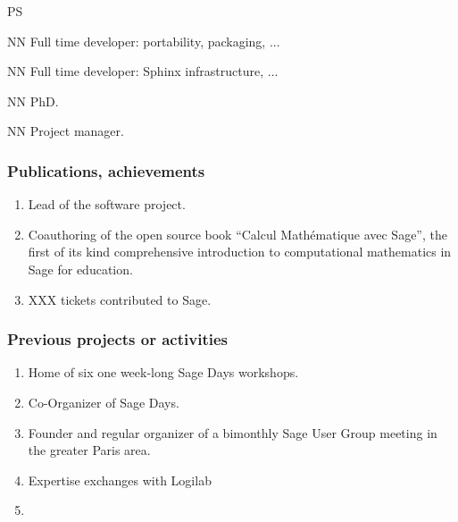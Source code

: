 \begin{sitedescription}{PS}

\begin{participant}[type=res,PM=48,salary=5500]{NN}
  Full time developer: portability, packaging, ...
\end{participant}

\begin{participant}[type=res,PM=36,salary=5500]{NN}
  Full time developer: Sphinx infrastructure, ...
\end{participant}

\begin{participant}[type=res,PM=36,salary=3100]{NN}
  PhD.
\end{participant}

\begin{participant}[type=res,PM=24,salary=3932]{NN}
  Project manager.
\end{participant}

\subsubsection*{Publications, achievements}


\begin{enumerate}
\item Lead of the \SageCombinat software project.
\item Coauthoring of the open source book ``Calcul Mathématique avec
  Sage'', the first of its kind comprehensive introduction to
  computational mathematics in Sage for education.
\item XXX tickets contributed to Sage.
\end{enumerate}


\subsubsection*{Previous projects or activities}

\begin{enumerate}
\item Home of six one week-long Sage Days workshops.
\item Co-Organizer of  Sage Days.
\item Founder and regular organizer of a bimonthly Sage User Group
  meeting in the greater Paris area.
\item Expertise exchanges with Logilab
\item {}
\end{enumerate}


\end{sitedescription}
